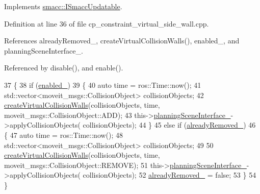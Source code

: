 Implements \hyperlink{classsmacc_1_1ISmaccUpdatable_a84ee0520cbefdb1d412bed54650b028e}{smacc\+::\+I\+Smacc\+Updatable}.



Definition at line 36 of file cp\+\_\+constraint\+\_\+virtual\+\_\+side\+\_\+wall.\+cpp.



References already\+Removed\+\_\+, create\+Virtual\+Collision\+Walls(), enabled\+\_\+, and planning\+Scene\+Interface\+\_\+.



Referenced by disable(), and enable().


\begin{DoxyCode}
37         \{
38             \textcolor{keywordflow}{if} (\hyperlink{classsm__moveit__4_1_1cl__moveit__z__client_1_1CpConstraintVirtualSideWall_a4456f8bf8328d103c2f9d3a04182babd}{enabled\_})
39             \{
40                 \textcolor{keyword}{auto} time = ros::Time::now();
41                 std::vector<moveit\_msgs::CollisionObject> collisionObjects;
42                 \hyperlink{classsm__moveit__4_1_1cl__moveit__z__client_1_1CpConstraintVirtualSideWall_a98bd6187825c00d9d6fca3ab4e1a1c5d}{createVirtualCollisionWalls}(collisionObjects, time, 
      moveit\_msgs::CollisionObject::ADD);
43                 this->\hyperlink{classsm__moveit__4_1_1cl__moveit__z__client_1_1CpConstraintVirtualSideWall_a50a72a86820c23dde2c433c8500f10bd}{planningSceneInterface\_}->applyCollisionObjects(
      collisionObjects);
44             \}
45             \textcolor{keywordflow}{else} \textcolor{keywordflow}{if} (\hyperlink{classsm__moveit__4_1_1cl__moveit__z__client_1_1CpConstraintVirtualSideWall_a99dce43a47cbd8774e2f7deb1b3e1c47}{alreadyRemoved\_})
46             \{
47                 \textcolor{keyword}{auto} time = ros::Time::now();
48                 std::vector<moveit\_msgs::CollisionObject> collisionObjects;
49 
50                 \hyperlink{classsm__moveit__4_1_1cl__moveit__z__client_1_1CpConstraintVirtualSideWall_a98bd6187825c00d9d6fca3ab4e1a1c5d}{createVirtualCollisionWalls}(collisionObjects, time, 
      moveit\_msgs::CollisionObject::REMOVE);
51                 this->\hyperlink{classsm__moveit__4_1_1cl__moveit__z__client_1_1CpConstraintVirtualSideWall_a50a72a86820c23dde2c433c8500f10bd}{planningSceneInterface\_}->applyCollisionObjects(
      collisionObjects);
52                 \hyperlink{classsm__moveit__4_1_1cl__moveit__z__client_1_1CpConstraintVirtualSideWall_a99dce43a47cbd8774e2f7deb1b3e1c47}{alreadyRemoved\_} = \textcolor{keyword}{false};
53             \}
54         \}
\end{DoxyCode}
